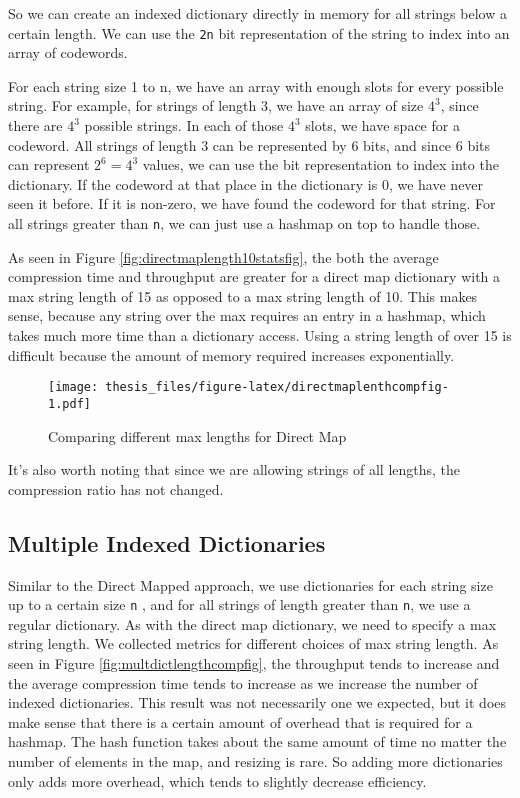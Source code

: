 \documentclass[12pt,twoside]{reedthesis}
\begin{document}
So we can create an indexed dictionary directly in memory for all strings below a certain length. We can use the \texttt{2n} bit representation of the string
to index into an array of codewords.

For each string size 1 to n, we have an array with enough slots for every possible string. For example, for strings of length 3, we have an array of size \(4^3\), since there are \(4^3\) possible strings. In each of those \(4^3\) slots, we have space for a codeword. All strings of length 3 can be represented by 6 bits, and since 6 bits can represent \(2^6=4^3\) values, we can use the bit representation to index into the dictionary. If the codeword at that place in the dictionary is 0, we have never seen it before. If it is non-zero, we have found the codeword for that string. For all strings greater than \texttt{n}, we can just use a hashmap on top to handle those.

As seen in Figure \ref{fig:directmaplength10statsfig}, the both the average compression time and throughput are greater for a direct map dictionary with a max string length of 15 as opposed to a max string length of 10. This makes sense, because any string over the max requires an entry in a hashmap, which takes much more time than a dictionary access. Using a string length of over 15 is difficult because the amount of memory required increases exponentially.
\begin{figure}
\centering
\texttt{[image: thesis\_files/figure-latex/directmaplenthcompfig-1.pdf]}
\caption{\label{fig:directmaplenthcompfig}Comparing different max lengths for Direct Map}
\end{figure}
It's also worth noting that since we are allowing strings of all lengths, the compression ratio has not changed.

\hypertarget{multiple-indexed-dictionaries}{%
\subsection{Multiple Indexed Dictionaries}\label{multiple-indexed-dictionaries}}

Similar to the Direct Mapped approach, we use dictionaries for each string size up to a certain size \texttt{n} , and for all strings of length greater than \texttt{n}, we use a regular dictionary. As with the direct map dictionary, we need to specify a max string length. We collected metrics for different choices of max string length. As seen in Figure \ref{fig:multdictlengthcompfig}, the throughput tends to increase and the average compression time tends to increase as we increase the number of indexed dictionaries. This result was not necessarily one we expected, but it does make sense that there is a certain amount of overhead that is required for a hashmap. The hash function takes about the same amount of time no matter the number of elements in the map, and resizing is rare. So adding more dictionaries only adds more overhead, which tends to slightly decrease efficiency.
\end{document}
